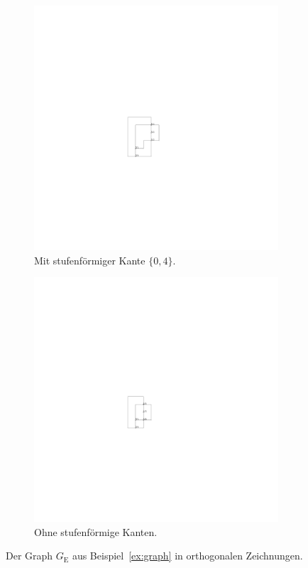\documentclass[a4paper]{scrreprt}
\theoremstyle{definition}
\begin{document}
\begin{figure}[h]
  \centering
\begin{subfigure}[b]{0.4\textwidth}
  \centering
  \includegraphics{exampleA_orthogonalNocompress}
  \caption{Mit stufenförmiger Kante $\{0,4\}$.}
  \label{fig:exampleAorthogonalNocompress}
\end{subfigure}
  \quad
\begin{subfigure}[b]{0.4\textwidth}
  \centering
  \includegraphics{exampleA_orthogonalCompress}
  \caption{Ohne stufenförmige Kanten.}
  \label{fig:exampleAorthogonalCompress}
\end{subfigure}

  \caption{Der Graph $G_\text{E}$ aus Beispiel~\ref{ex:graph} in orthogonalen Zeichnungen.}
  \label{fig:exampleAorthogonal}
\end{figure}
\end{document}
